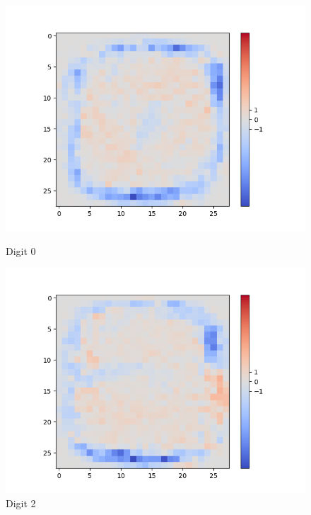 \begin{figure}[H]
	\captionsetup{labelformat=empty}
	\centering
	\begin{minipage}[b]{0.19\textwidth}
		\includegraphics[width=\textwidth]{Sigmoid(NO-Hidden)/Layer0-Neuron-0.png}
		\caption{Digit 0}
	\end{minipage}
	\begin{minipage}[b]{0.19\textwidth}
		\includegraphics[width=\textwidth]{Sigmoid(NO-Hidden)/Layer0-Neuron-2.png}
		\caption{Digit 2}
	\end{minipage}
	\begin{minipage}[b]{0.19\textwidth}

\end{minipage}
\end{figure}
